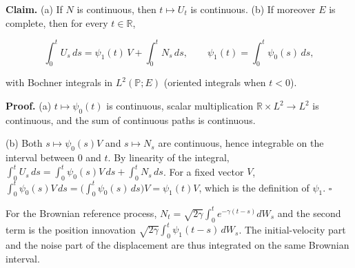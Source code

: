 \documentclass[11pt,a4paper]{article}
\begin{document}
\textbf{Claim.} (a) If \(N\) is continuous, then \(t\mapsto U_t\) is continuous. (b) If moreover \(E\) is complete, then for every \(t\in\mathbb R\),


\[\int_0^tU_s\,ds=\psi_1(t)\,V+\int_0^tN_s\,ds,\qquad\psi_1(t)=\int_0^t\psi_0(s)\,ds,\]


with Bochner integrals in \(L^2(\mathbb P;E)\) (oriented integrals when \(t<0\)).




\textbf{Proof.} (a) \(t\mapsto\psi_0(t)\) is continuous, scalar multiplication \(\mathbb R\times L^2\to L^2\) is continuous, and the sum of continuous paths is continuous.




(b) Both \(s\mapsto\psi_0(s)V\) and \(s\mapsto N_s\) are continuous, hence integrable on the interval between \(0\) and \(t\). By linearity of the integral, \(\int_0^tU_s\,ds=\int_0^t\psi_0(s)V\,ds+\int_0^tN_s\,ds\). For a fixed vector \(V\), \(\int_0^t\psi_0(s)V\,ds=\bigl(\int_0^t\psi_0(s)\,ds\bigr)V=\psi_1(t)V\), which is the definition of \(\psi_1\). \(\square\)




For the Brownian reference process, \(N_t=\sqrt{2\gamma}\int_0^te^{-\gamma(t-s)}dW_s\) and the second term is the position innovation \(\sqrt{2\gamma}\int_0^t\psi_1(t-s)\,dW_s\). The initial-velocity part and the noise part of the displacement are thus integrated on the same Brownian interval.
\end{document}
